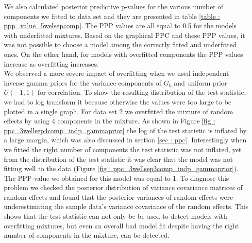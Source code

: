 We also calculated posterior predictive p-values for the various number of components we fitted to data set and they are presented in table \ref{table : ppp_value_5welsepcomp}. The PPP values are all equal to 0.5 for the models with underfitted mixtures. Based on the graphical PPC and these PPP values, it was not possible to choose a model among the correctly fitted and underfitted ones. On the other hand, for models with overfitted components the PPP values increase as overfitting increases.\\

We observed a more severe impact of overfitting when we used independent inverse gamma priors for the variance components of $G_k$ and uniform prior $U(-1,1)$ for correlation. To show the resulting distribution of the test statistic, we had to log transform it because otherwise the values were too large to be plotted in a single graph. For data set 2 we overfitted the mixture of random effects by using 4 components in the mixture. As shown in Figure \ref{fig : ppc_3wellsep4comp_indp_gammaprior} the log of the test statistic is inflated by a large margin, which was also discussed in section \ref{sec : ppc}. Interestingly when we fitted the right number of components the test statistic was not inflated, yet from the distribution of the test statistic it was clear that the model was not fitting well to the data (Figure \ref{fig : ppc_3wellsep3comp_indp_gammaprior}). The PPP-value we obtained for this model was equal to 1. To diagnose this problem we checked the posterior distribution of variance covariance matrices of random effects and found that the posterior variances of random effects were underestimating the sample data's variance covariance of the random effects. This shows that the test statistic can not only be be used to detect models with overfitting mixtures, but even an overall bad model fit despite having the right number of components in the mixture, can be detected.\\

